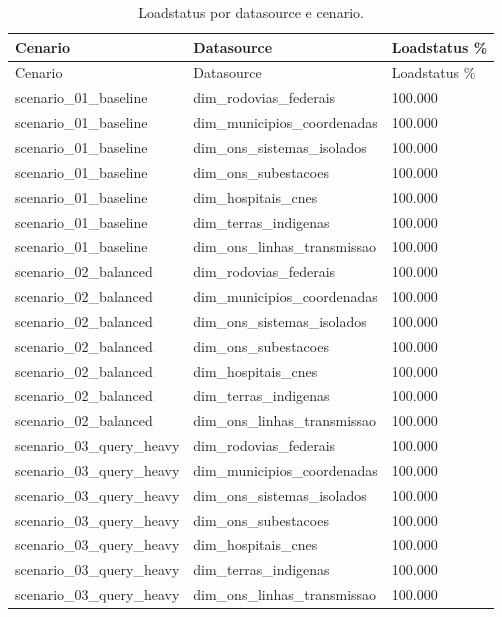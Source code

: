 {
\small
\setlength{\tabcolsep}{4pt}
\renewcommand{\arraystretch}{1.15}
\begin{longtable}{p{}p{}p{}}
\caption{Loadstatus por datasource e cenario.}\\
\toprule
Cenario & Datasource & Loadstatus \% \\
\midrule
\endfirsthead
\toprule
Cenario & Datasource & Loadstatus \% \\
\midrule
\endhead
scenario\_01\_baseline & dim\_rodovias\_federais & 100.000 \\
scenario\_01\_baseline & dim\_municipios\_coordenadas & 100.000 \\
scenario\_01\_baseline & dim\_ons\_sistemas\_isolados & 100.000 \\
scenario\_01\_baseline & dim\_ons\_subestacoes & 100.000 \\
scenario\_01\_baseline & dim\_hospitais\_cnes & 100.000 \\
scenario\_01\_baseline & dim\_terras\_indigenas & 100.000 \\
scenario\_01\_baseline & dim\_ons\_linhas\_transmissao & 100.000 \\
scenario\_02\_balanced & dim\_rodovias\_federais & 100.000 \\
scenario\_02\_balanced & dim\_municipios\_coordenadas & 100.000 \\
scenario\_02\_balanced & dim\_ons\_sistemas\_isolados & 100.000 \\
scenario\_02\_balanced & dim\_ons\_subestacoes & 100.000 \\
scenario\_02\_balanced & dim\_hospitais\_cnes & 100.000 \\
scenario\_02\_balanced & dim\_terras\_indigenas & 100.000 \\
scenario\_02\_balanced & dim\_ons\_linhas\_transmissao & 100.000 \\
scenario\_03\_query\_heavy & dim\_rodovias\_federais & 100.000 \\
scenario\_03\_query\_heavy & dim\_municipios\_coordenadas & 100.000 \\
scenario\_03\_query\_heavy & dim\_ons\_sistemas\_isolados & 100.000 \\
scenario\_03\_query\_heavy & dim\_ons\_subestacoes & 100.000 \\
scenario\_03\_query\_heavy & dim\_hospitais\_cnes & 100.000 \\
scenario\_03\_query\_heavy & dim\_terras\_indigenas & 100.000 \\
scenario\_03\_query\_heavy & dim\_ons\_linhas\_transmissao & 100.000 \\
\bottomrule
\end{longtable}
}
